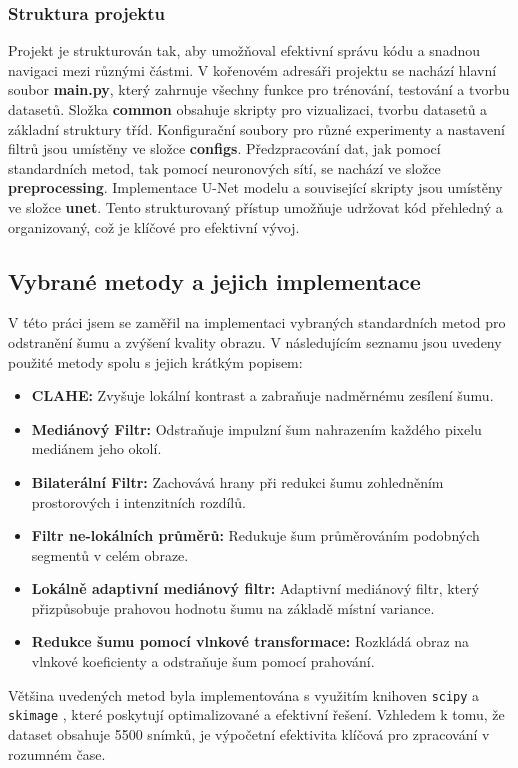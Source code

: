 \documentclass[male,czech,api_ing]{thesis}
\begin{document}
\subsubsection{Struktura projektu}
Projekt je strukturován tak, aby umožňoval efektivní správu kódu a snadnou navigaci mezi různými částmi. V kořenovém adresáři projektu se nachází hlavní soubor \textbf{main.py}, který zahrnuje všechny funkce pro trénování, testování a tvorbu datasetů. Složka \textbf{common} obsahuje skripty pro vizualizaci, tvorbu datasetů a základní struktury tříd. Konfigurační soubory pro různé experimenty a nastavení filtrů jsou umístěny ve složce \textbf{configs}. Předzpracování dat, jak pomocí standardních metod, tak pomocí neuronových sítí, se nachází ve složce \textbf{preprocessing}. Implementace U-Net modelu a související skripty jsou umístěny ve složce \textbf{unet}. Tento strukturovaný přístup umožňuje udržovat kód přehledný a organizovaný, což je klíčové pro efektivní vývoj.

\subsection{Vybrané metody a jejich implementace}
V této práci jsem se zaměřil na implementaci vybraných standardních metod pro odstranění šumu a zvýšení kvality obrazu. V následujícím seznamu jsou uvedeny použité metody spolu s jejich krátkým popisem: 

\begin{itemize}
    \item \textbf{CLAHE:} Zvyšuje lokální kontrast a zabraňuje nadměrnému zesílení šumu.
    \item \textbf{Mediánový Filtr:} Odstraňuje impulzní šum nahrazením každého pixelu mediánem jeho okolí.
    \item \textbf{Bilaterální Filtr:} Zachovává hrany při redukci šumu zohledněním prostorových i intenzitních rozdílů.
    \item \textbf{Filtr ne-lokálních průměrů:} Redukuje šum průměrováním podobných segmentů v celém obraze.
    \item \textbf{Lokálně adaptivní mediánový filtr:} Adaptivní mediánový filtr, který přizpůsobuje prahovou hodnotu šumu na základě místní variance.
    \item \textbf{Redukce šumu pomocí vlnkové transformace:} Rozkládá obraz na vlnkové koeficienty a odstraňuje šum pomocí prahování.
\end{itemize}

Většina uvedených metod byla implementována s využitím knihoven \texttt{scipy} \cite{scipy} a \texttt{skimage} \cite{scikit}, které poskytují optimalizované a efektivní řešení. Vzhledem k tomu, že dataset obsahuje 5500 snímků, je výpočetní efektivita klíčová pro zpracování v rozumném čase.
\end{document}
